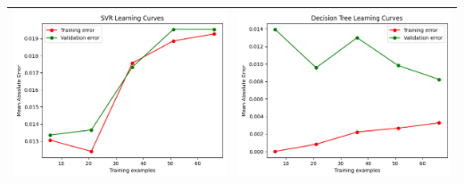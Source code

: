 \begin{table}[H]
    \centering
    \footnotesize
    \setlength\tabcolsep{0pt}
    \begin{tabularx}{\textwidth}{|X|X|}
        \hline
        \includegraphics[width=\linewidth, trim=0 0 0 0]{images/SVR_lc90_ridottoAzure.png} &
        \includegraphics[width=\linewidth, trim=0 0 0 0]{images/DecisionTree_lc90_ridottoAzure.png} \\
        \hline

\end{tabularx}
\end{table}
